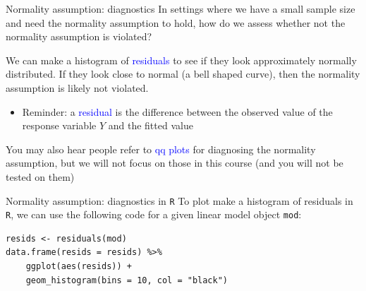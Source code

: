\documentclass[10pt,t]{beamer}
\begin{document}
\begin{frame}{Normality assumption: diagnostics}
In settings where we have a small sample size and need the normality assumption to hold, how do we assess whether not the normality assumption is violated?

\vspace{0.3cm}

We can make a histogram of \textcolor{blue}{residuals} to see if they look approximately normally distributed. If they look close to normal (a bell shaped curve), then the normality assumption is likely not violated.

\vspace{0.3cm}

\begin{itemize}
	\item[] Reminder: a \textcolor{blue}{residual} is the difference between the observed value of the response variable $Y$ and the fitted value 
\end{itemize}

\vspace{0.3cm}

\small You may also hear people refer to \textcolor{blue}{qq plots} for diagnosing the normality assumption, but we will not focus on those in this course (and you will not be tested on them)

\end{frame}

\begin{frame}[fragile]{Normality assumption: diagnostics in \texttt{R}}
To plot make a histogram of residuals in \texttt{R}, we can use the following code for a given linear model object \texttt{mod}:

\vspace{0.3cm}

\begin{lstlisting}
resids <- residuals(mod)
data.frame(resids = resids) %>%
    ggplot(aes(resids)) +
    geom_histogram(bins = 10, col = "black")
\end{lstlisting}

\end{frame}
\end{document}
